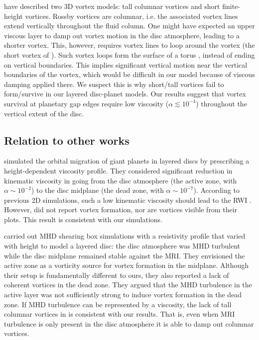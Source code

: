 \cite{barranco05} have described two 
3D vortex models: tall columnar vortices and short finite-height vortices. 
Rossby vortices are columnar, i.e. the associated vortex lines
extend vertically throughout the fluid column. One might have expected
an upper viscous layer to damp out vortex motion in the disc atmosphere, leading to a shorter
vortex. This, however, requires vortex lines to loop around the
vortex (the short vortex of \citeauthor{barranco05}). Such  
vortex loops form the surface of a torus \citep[see, for 
  example, Fig. 1 in][]{barranco05}, instead of ending on 
vertical boundaries. This implies significant vertical
motion near the vertical boundaries of the vortex, which would be  
difficult in our model because of viscous damping applied there. We
suspect this is why short/tall vortices fail to form/survive in our
layered disc-planet models.  Our results suggest that vortex
survival at planetary gap edges require low viscosity
($\alpha\lesssim10^{-4}$) throughout the vertical extent of the
disc.     


\subsection{Relation to other works}
\cite{pierens10} simulated the orbital migration of giant planets in
layered discs by prescribing a height-dependent viscosity profile. They
considered significant reduction in kinematic viscosity in going from
the disc atmosphere (the active zone, with $\alpha\sim10^{-2}$) to the
disc midplane (the dead zone, with $\alpha\sim10^{-7}$). According to
previous 2D simulations, such a low kinematic viscosity should lead to
the RWI \citep{valborro06,valborro07}. However, \citeauthor{pierens10}
did not report vortex formation, nor are vortices visible from their
plots. This result is consistent with our simulations. 

\cite{oishi09} carried out MHD shearing box simulations with 
a resistivity profile that varied with height to model a
layered disc: the disc atmosphere was MHD turbulent while the disc
midplane remained stable against the MRI. They envisioned the active
zone as a vorticity source for vortex formation in the midplane.  
Although their setup is fundamentally different to ours, they also
reported a lack of coherent vortices in the dead zone. They argued
that the MHD turbulence in the active layer was not sufficiently strong
to induce vortex formation in the dead zone. If MHD turbulence can be
represented by a viscosity, the lack of tall columnar vortices in
\citeauthor{oishi09} is consistent with our results. That is,
even when MRI turbulence is only present in the disc atmosphere it is
able to damp out columnar vortices.     

